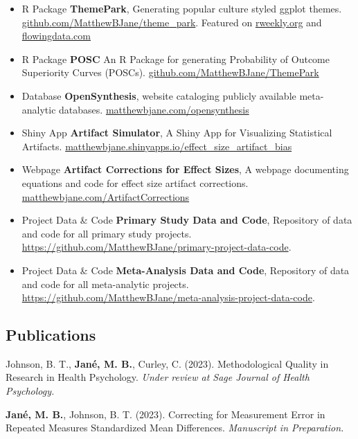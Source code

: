 \documentclass[
  letterpaper,
  DIV=11,
  numbers=noendperiod]{scrartcl}
\begin{document}
\begin{itemize}
\item
  { R Package} \textbf{ThemePark}, Generating popular culture styled
  ggplot themes.
  \href{https://github.com/MatthewBJane/theme_park}{github.com/MatthewBJane/theme\_park}.
  Featured on \href{https://rweekly.org/2023-W32.html}{rweekly.org} and
  \href{https://flowingdata.com/2023/07/28/barbie-and-oppenheimer-themes-for-charts-in-r/}{flowingdata.com}
\item
  { R Package} \textbf{POSC} An R Package for generating Probability of
  Outcome Superiority Curves (POSCs).
  \href{https://github.com/MatthewBJane/ThemePark}{github.com/MatthewBJane/ThemePark}
\item
  { Database} \textbf{OpenSynthesis}, website cataloging publicly
  available meta-analytic databases.
  \href{https://matthewbjane.com/opensynthesis}{matthewbjane.com/opensynthesis}
\item
  { Shiny App} \textbf{Artifact Simulator}, A Shiny App for Visualizing
  Statistical Artifacts.
  \url{matthewbjane.shinyapps.io/effect_size_artifact_bias}
\item
  { Webpage} \textbf{Artifact Corrections for Effect Sizes}, A webpage
  documenting equations and code for effect size artifact corrections.
  \url{matthewbjane.com/ArtifactCorrections}
\item
  { Project Data \& Code} \textbf{Primary Study Data and Code},
  Repository of data and code for all primary study projects.
  \url{https://github.com/MatthewBJane/primary-project-data-code}.
\item
  { Project Data \& Code} \textbf{Meta-Analysis Data and Code},
  Repository of data and code for all meta-analytic projects.
  \url{https://github.com/MatthewBJane/meta-analysis-project-data-code}.
\end{itemize}

\hypertarget{publications}{%
\subsection{\texorpdfstring{
Publications}{ Publications}}\label{publications}}

Johnson, B. T., \textbf{Jané, M. B.}, Curley, C. (2023). Methodological
Quality in Research in Health Psychology. \emph{Under review at Sage
Journal of Health Psychology.}

\textbf{Jané, M. B.}, Johnson, B. T. (2023). Correcting for Measurement
Error in Repeated Measures Standardized Mean Differences.
\emph{Manuscript in Preparation.}
\end{document}
